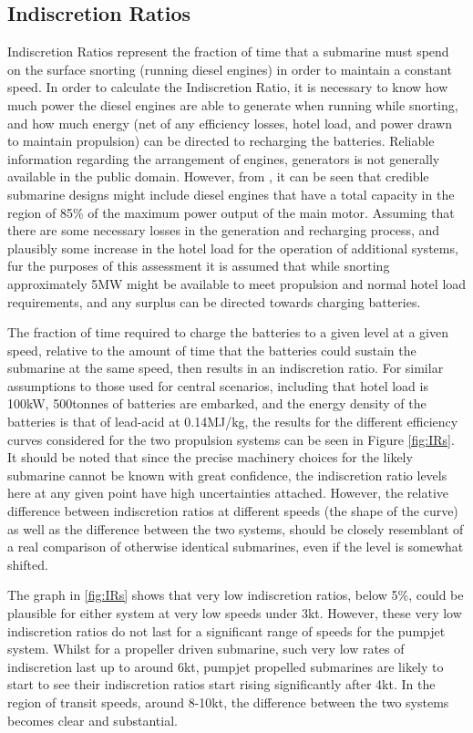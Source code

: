 \documentclass{article}\usepackage[]{graphicx}\usepackage[]{color}
\begin{document}
\subsection{Indiscretion Ratios}
Indiscretion Ratios represent the fraction of time that a submarine must spend on the surface snorting (running diesel engines) in order to maintain a constant speed.  In order to calculate the Indiscretion Ratio, it is necessary to know how much power the diesel engines are able to generate when running while snorting, and how much energy (net of any efficiency losses, hotel load, and power drawn to maintain propulsion) can be directed to recharging the batteries. Reliable information regarding the arrangement of engines, generators is not generally available in the public domain.  However, from \cite{patrick2012}, it can be seen that credible submarine designs might include diesel engines that have a total capacity in the region of 85\% of the maximum power output of the main motor.  Assuming that there are some necessary losses in the generation and recharging process, and plausibly some increase in the hotel load for the operation of additional systems, fur the purposes of this assessment it is assumed that while snorting approximately 5MW might be available to meet propulsion and normal hotel load requirements, and any surplus can be directed towards charging batteries.

The fraction of time required to charge the batteries to a given level at a given speed, relative to the amount of time that the batteries could sustain the submarine at the same speed, then results in an indiscretion ratio.  For similar assumptions to those used for central scenarios, including that hotel load is 100kW, 500tonnes of batteries are embarked, and the energy density of the batteries is that of lead-acid at 0.14MJ/kg, the results for the different efficiency curves considered for the two propulsion systems can be seen in Figure \ref{fig:IRs}.  It should be noted that since the precise machinery choices for the likely submarine cannot be known with great confidence, the indiscretion ratio levels here at any given point have high uncertainties attached.  However, the relative difference between indiscretion ratios at different speeds (the shape of the curve) as well as the difference between the two systems, should be closely resemblant of a real comparison of otherwise identical submarines, even if the level is somewhat shifted.

The graph in \ref{fig:IRs} shows that very low indiscretion ratios, below 5\%, could be plausible for either system at very low speeds under 3kt.  However, these very low indiscretion ratios do not last for a significant range of speeds for the pumpjet system. Whilst for a propeller driven submarine, such very low rates of indiscretion last up to around 6kt, pumpjet propelled submarines are likely to start to see their indiscretion ratios start rising significantly after 4kt. In the region of transit speeds, around 8-10kt, the difference between the two systems becomes clear and substantial.
\end{document}
